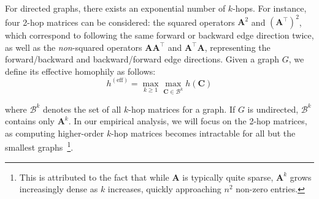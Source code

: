 \documentclass{article}
\newcommand\nnodes{n}
\newcommand\effhom{h^{(\text{eff})}}
\theoremstyle{plain}
\theoremstyle{definition}
\theoremstyle{remark}
\begin{document}
For directed graphs, there exists an exponential number of $k$-hops. For instance, four 2-hop matrices can be considered: the squared operators $\mathbf{A}^2$ and $(\mathbf{A}^\top)^2$, which correspond to following the same forward or backward edge direction twice, as well as the {\em non}-squared operators $\mathbf{A}\mathbf{A}^\top$ and $\mathbf{A}^\top\mathbf{A}$, representing the forward/backward and backward/forward edge directions. Given a graph $G$, we define its effective homophily as follows:
\begin{equation}
\effhom = \max_{k \geq 1}
\max_{\mathbf{C} \in \mathcal{B}^k} h(\mathbf{C})
\end{equation}

where $\mathcal{B}^k$ denotes the set of all $k$-hop matrices for a graph. If $G$ is undirected, $\mathcal{B}^k$ contains only $\mathbf{A}^k$. In our empirical analysis, we will focus on the 2-hop matrices, as computing higher-order $k$-hop matrices becomes intractable for all but the smallest graphs~\footnote{This is attributed to the fact that while $\mathbf{A}$ is typically quite sparse, $\mathbf{A}^k$ grows increasingly dense as $k$ increases, quickly approaching $\nnodes^{2}$ non-zero entries.}. 
\end{document}
